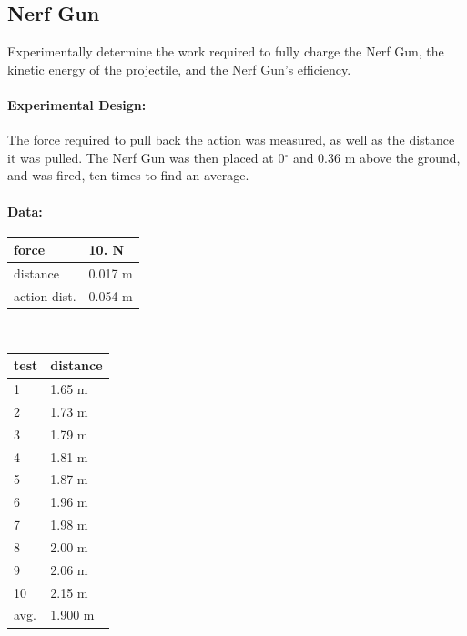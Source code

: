 \documentclass[12pt]{article}
\begin{document}
	\subsection{Nerf Gun}
	Experimentally determine the work required to fully charge the Nerf Gun, the kinetic energy of the projectile, and the Nerf Gun's efficiency.
	\paragraph{Experimental Design:} The force required to pull back the action was measured, as well as the distance it was pulled. The Nerf Gun was then placed at 0$^{\circ}$ and 0.36 m above the ground, and was fired, ten times to find an average.
	\paragraph{Data:}
	\begin{flushleft}
	\begin{tabular}{ l|l }
		force & 10. N \\
		\hline
		distance & 0.017 m \\
		\hline
		action dist. & 0.054 m
	\end{tabular} \\
	\begin{tabular}{ l|l }
		test & distance \\
		\hline
		1 & 1.65 m \\
		2 & 1.73 m \\
		3 & 1.79 m \\
		4 & 1.81 m \\
		5 & 1.87 m \\
		6 & 1.96 m \\
		7 & 1.98 m \\
		8 & 2.00 m \\
		9 & 2.06 m \\
		10 & 2.15 m \\
		avg. & 1.900 m \\
	\end{tabular}
	\end{flushleft}
\end{document}
